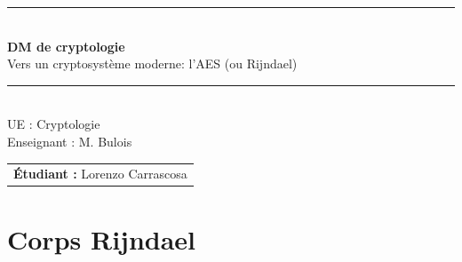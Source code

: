 \documentclass[a4paper, 12pt]{article}
\begin{document}
\begin{titlepage}
\thispagestyle{empty}

\begin{center}

\rule{\linewidth}{0.4pt}\\[0.6cm]
{\huge \textbf{DM de cryptologie}}\\[0.3cm]
{\Large Vers un cryptosystème moderne: l'AES (ou Rijndael)}\\[0.6cm]
\rule{\linewidth}{0.4pt}\\[2cm]

{\large UE : Cryptologie}\\[0.3cm]
{\large Enseignant : M. Bulois}\\[3cm]

\end{center}

\vfill
\begin{flushright}
\begin{tabular}{l}
\textbf{Étudiant :} Lorenzo Carrascosa \\
\end{tabular}
\end{flushright}

\end{titlepage}

\pagebreak
\tableofcontents
\pagebreak

\section{Corps Rijndael}
\end{document}
